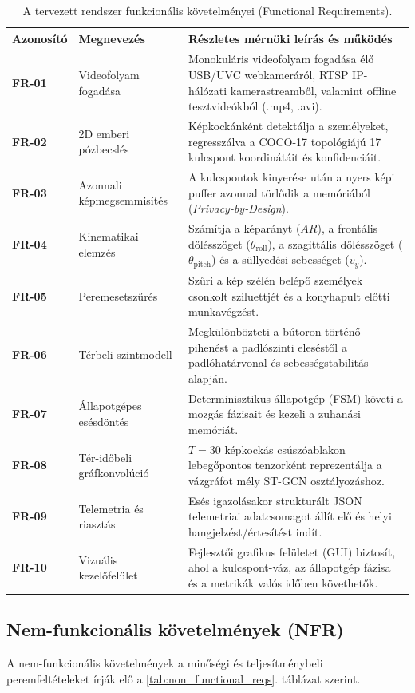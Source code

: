 \documentclass[12pt,a4paper,oneside]{report}
\begin{document}
\begin{table}[H]
\centering
\small
\begin{tabularx}{\textwidth}{lp{3.5cm}X}
\toprule
\textbf{Azonosító} & \textbf{Megnevezés} & \textbf{Részletes mérnöki leírás és működés} \\
\midrule
\textbf{FR-01} & Videofolyam fogadása & Monokuláris videofolyam fogadása élő USB/UVC webkameráról, RTSP IP-hálózati kamerastreamből, valamint offline tesztvideókból (.mp4, .avi). \\
\textbf{FR-02} & 2D emberi pózbecslés & Képkockánként detektálja a személyeket, regresszálva a COCO-17 topológiájú 17 kulcspont koordinátáit és konfidenciáit. \\
\textbf{FR-03} & Azonnali képmegsemmisítés & A kulcspontok kinyerése után a nyers képi puffer azonnal törlődik a memóriából (\textit{Privacy-by-Design}). \\
\textbf{FR-04} & Kinematikai elemzés & Számítja a képarányt ($AR$), a frontális dőlésszöget ($\theta_{\text{roll}}$), a szagittális dőlésszöget ($\theta_{\text{pitch}}$) és a süllyedési sebességet ($v_y$). \\
\textbf{FR-05} & Peremesetszűrés & Szűri a kép szélén belépő személyek csonkolt sziluettjét és a konyhapult előtti munkavégzést. \\
\textbf{FR-06} & Térbeli szintmodell & Megkülönbözteti a bútoron történő pihenést a padlószinti eleséstől a padlóhatárvonal és sebességstabilitás alapján. \\
\textbf{FR-07} & Állapotgépes esésdöntés & Determinisztikus állapotgép (FSM) követi a mozgás fázisait és kezeli a zuhanási memóriát. \\
\textbf{FR-08} & Tér-időbeli gráfkonvolúció & $T=30$ képkockás csúszóablakon lebegőpontos tenzorként reprezentálja a vázgráfot mély ST-GCN osztályozáshoz. \\
\textbf{FR-09} & Telemetria és riasztás & Esés igazolásakor strukturált JSON telemetriai adatcsomagot állít elő és helyi hangjelzést/értesítést indít. \\
\textbf{FR-10} & Vizuális kezelőfelület & Fejlesztői grafikus felületet (GUI) biztosít, ahol a kulcspont-váz, az állapotgép fázisa és a metrikák valós időben követhetők. \\
\bottomrule
\end{tabularx}
\caption{A tervezett rendszer funkcionális követelményei (Functional Requirements).}
\label{tab:functional_reqs}
\end{table}

\subsection{Nem-funkcionális követelmények (NFR)}
A nem-funkcionális követelmények a minőségi és teljesítménybeli peremfeltételeket írják elő a \ref{tab:non_functional_reqs}. táblázat szerint.
\end{document}
